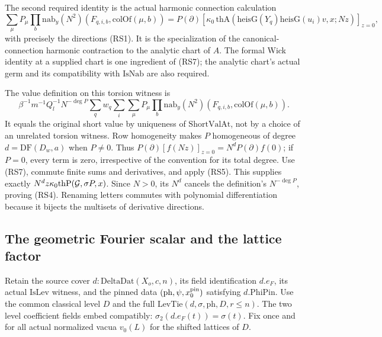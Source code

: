 The second required identity is the actual harmonic
connection calculation
\[
 \sum_\mu P_\mu\prod_b
          \mathrm{nab}_y(N^2)(F_{q,i,b},\mathrm{colOf}(\mu,b))
   =P(\partial)\left[
       \kappa_0\,
       \mathrm{thA}(\mathrm{heisG}(Y_q)
                       \mathrm{heisG}(u_i)v,x;Nz)\right]_{z=0},
 \tag{RS7}\label{eq:sr-source-reading-harmonic-connection}
\]
with precisely the directions (RS1).
It is the specialization of the canonical-connection
harmonic contraction to the analytic chart of \(A\).
The formal Wick identity at a supplied chart is one
ingredient of (RS7); the analytic chart's actual germ
and its compatibility with \(\mathrm{IsNab}\) are also
required.

The value definition on this torsion witness is
\[
 \beta^{-1}m^{-1}Q_l^{-1}N^{-\deg P}
    \sum_q w_q\sum_i\sum_\mu P_\mu
             \prod_b\mathrm{nab}_y(N^2)
                           (F_{q,i,b},\mathrm{colOf}(\mu,b)).
\]
It equals the original short value by uniqueness of
\(\mathrm{ShortValAt}\), not by a choice of an unrelated
torsion witness.
Row homogeneity makes \(P\) homogeneous of degree
\(d=\mathrm{DF}(D_w,a)\) when \(P\ne0\).
Thus \(P(\partial)[f(Nz)]_{z=0}=N^dP(\partial)f(0)\);
if \(P=0\), every term is zero, irrespective of the
convention for its total degree.
Use (RS7), commute finite sums and derivatives,
and apply (RS5).  This supplies exactly
\(N^d z\kappa_0\mathrm{thP}({\cal G},\sigma P,x)\).
Since \(N>0\), its \(N^d\) cancels the definition's
\(N^{-\deg P}\), proving (RS4).
Renaming letters commutes with polynomial differentiation
because it bijects the multisets of derivative directions.

\subsection{The geometric Fourier scalar and the lattice factor}
Retain the source cover \(d:\mathrm{DeltaDat}(X_o,c,n)\),
its field identification \(d.e_F\), its actual
\(\mathrm{IsLev}\) witness, and the pinned data
\((\mathrm{ph},\psi,x_0^{\rm pin})\) satisfying
\(d.\mathrm{PhiPin}\).
Use the common classical level \(D\) and the full
\(\mathrm{LevTie}(d,\sigma,\mathrm{ph},D,r\le n)\).
The two level coefficient fields embed compatibly:
\(\sigma_2(d.e_F(t))=\sigma(t)\).
Fix once and for all actual normalized vacua \(v_0(L)\)
for the shifted lattices of \(D\).


